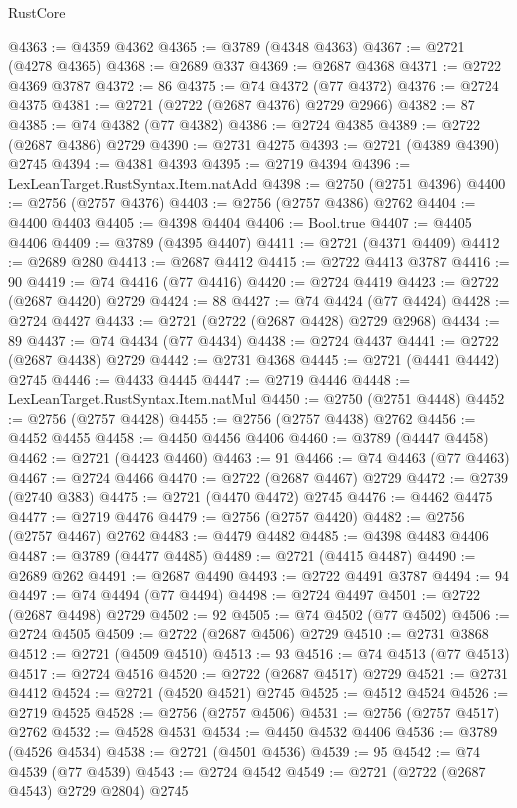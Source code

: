 \begin{lexlean}{RustCore}
\begin{coremodule}
@4363 := @4359 @4362
@4365 := @3789 (@4348 @4363)
@4367 := @2721 (@4278 @4365)
@4368 := @2689 @337
@4369 := @2687 @4368
@4371 := @2722 @4369 @3787
@4372 := 86
@4375 := @74 @4372 (@77 @4372)
@4376 := @2724 @4375
@4381 := @2721 (@2722 (@2687 @4376) @2729 @2966)
@4382 := 87
@4385 := @74 @4382 (@77 @4382)
@4386 := @2724 @4385
@4389 := @2722 (@2687 @4386) @2729
@4390 := @2731 @4275
@4393 := @2721 (@4389 @4390) @2745
@4394 := @4381 @4393
@4395 := @2719 @4394
@4396 := LexLeanTarget.RustSyntax.Item.natAdd
@4398 := @2750 (@2751 @4396)
@4400 := @2756 (@2757 @4376)
@4403 := @2756 (@2757 @4386) @2762
@4404 := @4400 @4403
@4405 := @4398 @4404
@4406 := Bool.true
@4407 := @4405 @4406
@4409 := @3789 (@4395 @4407)
@4411 := @2721 (@4371 @4409)
@4412 := @2689 @280
@4413 := @2687 @4412
@4415 := @2722 @4413 @3787
@4416 := 90
@4419 := @74 @4416 (@77 @4416)
@4420 := @2724 @4419
@4423 := @2722 (@2687 @4420) @2729
@4424 := 88
@4427 := @74 @4424 (@77 @4424)
@4428 := @2724 @4427
@4433 := @2721 (@2722 (@2687 @4428) @2729 @2968)
@4434 := 89
@4437 := @74 @4434 (@77 @4434)
@4438 := @2724 @4437
@4441 := @2722 (@2687 @4438) @2729
@4442 := @2731 @4368
@4445 := @2721 (@4441 @4442) @2745
@4446 := @4433 @4445
@4447 := @2719 @4446
@4448 := LexLeanTarget.RustSyntax.Item.natMul
@4450 := @2750 (@2751 @4448)
@4452 := @2756 (@2757 @4428)
@4455 := @2756 (@2757 @4438) @2762
@4456 := @4452 @4455
@4458 := @4450 @4456 @4406
@4460 := @3789 (@4447 @4458)
@4462 := @2721 (@4423 @4460)
@4463 := 91
@4466 := @74 @4463 (@77 @4463)
@4467 := @2724 @4466
@4470 := @2722 (@2687 @4467) @2729
@4472 := @2739 (@2740 @383)
@4475 := @2721 (@4470 @4472) @2745
@4476 := @4462 @4475
@4477 := @2719 @4476
@4479 := @2756 (@2757 @4420)
@4482 := @2756 (@2757 @4467) @2762
@4483 := @4479 @4482
@4485 := @4398 @4483 @4406
@4487 := @3789 (@4477 @4485)
@4489 := @2721 (@4415 @4487)
@4490 := @2689 @262
@4491 := @2687 @4490
@4493 := @2722 @4491 @3787
@4494 := 94
@4497 := @74 @4494 (@77 @4494)
@4498 := @2724 @4497
@4501 := @2722 (@2687 @4498) @2729
@4502 := 92
@4505 := @74 @4502 (@77 @4502)
@4506 := @2724 @4505
@4509 := @2722 (@2687 @4506) @2729
@4510 := @2731 @3868
@4512 := @2721 (@4509 @4510)
@4513 := 93
@4516 := @74 @4513 (@77 @4513)
@4517 := @2724 @4516
@4520 := @2722 (@2687 @4517) @2729
@4521 := @2731 @4412
@4524 := @2721 (@4520 @4521) @2745
@4525 := @4512 @4524
@4526 := @2719 @4525
@4528 := @2756 (@2757 @4506)
@4531 := @2756 (@2757 @4517) @2762
@4532 := @4528 @4531
@4534 := @4450 @4532 @4406
@4536 := @3789 (@4526 @4534)
@4538 := @2721 (@4501 @4536)
@4539 := 95
@4542 := @74 @4539 (@77 @4539)
@4543 := @2724 @4542
@4549 := @2721 (@2722 (@2687 @4543) @2729 @2804) @2745

\end{coremodule}
\end{lexlean}
